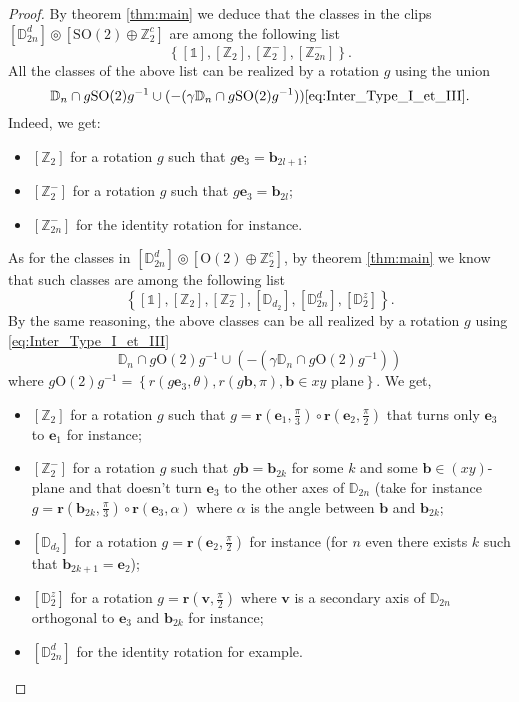 \documentclass[11pt,a4paper]{amsart}
\theoremstyle{definition}
\newcommand{\ZZ}{\mathbb{Z}}                %
\newcommand{\OO}{\mathrm{O}}                %
\newcommand{\SO}{\mathrm{SO}}               %
\newcommand{\DD}{\mathbb{D}}                %
\newcommand{\1}{\mathds{1}}		            %
\newcommand{\ee}{\pmb{e}}                   %
\newcommand{\vv}{\pmb{v}}                   %
\newcommand{\vR}{\mathbf{r}}
\newcommand{\bb}{\mathbf{b}}
\newcommand{\set}[1]{\left\{#1\right\}}     %
\newcommand{\Dnd}{\DD_{2n}^d}
\begin{document}
\begin{proof}
	By theorem \ref{thm:main} we deduce that the classes in the clips $[\Dnd] \circledcirc [\SO(2) \oplus \ZZ_2^c]$ are among the following list
		\begin{equation*}
		\set{[\1],[\ZZ_2],[\ZZ_2^-],[\ZZ_{2n}^-]}.
		\end{equation*} 
		All the classes of the above list can be realized by a rotation $g$ using the union $$ \DD_n\cap g\SO(2)g^{-1} \cup (-(\gamma\DD_n\cap g\SO(2)g^{-1}))\eqref{eq:Inter_Type_I_et_III}.$$ Indeed, we get:
		\begin{itemize}
			\item $[\ZZ_2]$ for a rotation $g$ such that $g\ee_3=\bb_{2l+1}$;
			\item $[\ZZ_2^-]$ for a rotation $g$ such that $g\ee_3=\bb_{2l}$;
			\item $[\ZZ_{2n}^-]$ for the identity rotation for instance.
		\end{itemize}
		As for the classes in $[\Dnd] \circledcirc [\OO(2) \oplus \ZZ_2^c]$, by theorem \ref{thm:main} we know that such classes are among the following list
		\begin{equation*}
		\set{[\1],[\ZZ_{2}],[\ZZ_2^-],[\DD_{d_2}],[\DD_{2n}^d],[\DD_{2}^z]}.
		\end{equation*}
		By the same reasoning, the above classes can be all realized by a rotation $g$ using \eqref{eq:Inter_Type_I_et_III}
		\begin{equation*}
		\DD_n\cap g\OO(2)g^{-1} \cup (-(\gamma\DD_n\cap g\OO(2)g^{-1}))
		\end{equation*}
		where $g\OO(2)g^{-1}=\set{r(g\ee_3,\theta),r(g\bb,\pi),\bb\in xy \text{ plane}}$. We get,
		
		\begin{itemize}
			\item $[\ZZ_2]$ for a rotation $g$ such that $g=\vR\left(\ee_1,\frac{\pi}{3}\right)\circ \vR\left(\ee_2,\frac{\pi}{2}\right)$ that turns only $\ee_3$ to $\ee_1$ for instance;
			\item $[\ZZ_2^-]$ for a rotation $g$ such that $g\bb=\bb_{2k}$ for some $k$ and some $\bb\in (xy)$-plane and that doesn't turn $\ee_3$ to the other axes of $\DD_{2n}$ (take for instance $g=\vR\left(\bb_{2k},\frac{\pi}{3}\right)\circ \vR\left(\ee_3,\alpha\right)$ where $\alpha$ is the angle between $\bb$ and $\bb_{2k}$;
			\item $[\DD_{d_2}]$ for a rotation $g=\vR\left(\ee_2,\frac{\pi}{2}\right)$ for instance (for $n$ even there exists $k$ such that $\bb_{2k+1}=\ee_2$);
			\item $[\DD_2^z]$ for a rotation $g=\vR\left(\vv,\frac{\pi}{2}\right)$ where $\vv$ is a secondary axis of $\DD_{2n}$ orthogonal to $\ee_3$ and $\bb_{2k}$ for instance;
			\item $[\DD_{2n}^d]$ for the identity rotation for example.
			
		\end{itemize}
\end{proof}	
	
\end{document}
